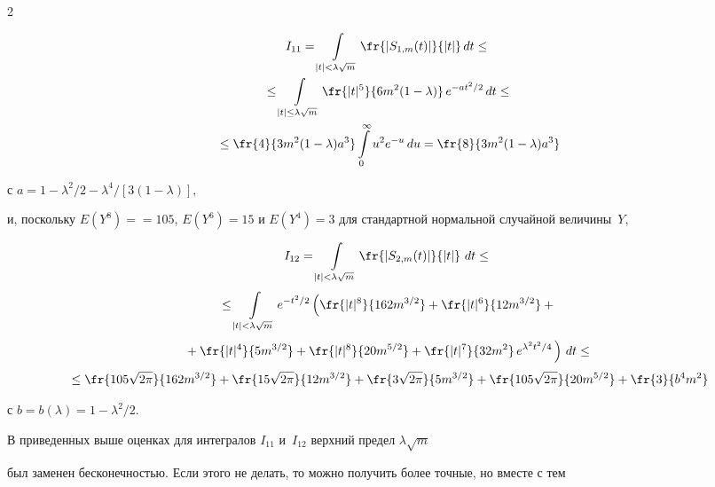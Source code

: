 \begin{multicols}{2}
\noindent


\begin{multline*}


I_{11}  =  \int\limits_{|t|<\lambda\sqrt{m}} \fr{|S_{1,m}(t)|}{|t|} \,dt \leq{}\\


{}\leq \int\limits_{|t| \leq \lambda\sqrt{m}} \fr{|t|^5}{6m^2(1-\lambda)} \,e^{-at^2/2}\,dt \leq{}\\


{}\leq  \fr{4}{3m^2(1-\lambda)a^3}\int\limits_0^\infty u^2e^{-u}\,du


= \fr{8}{3m^2(1-\lambda)a^3} 




\end{multline*}


с  $a=1 -  \lambda^2/2 -   \lambda^4/[3(1-\lambda)]$,


и, поскольку $E(Y^8)=$\linebreak $=105$, $E(Y^6)=15$ и $E(Y^4)=3$ для стандартной нормальной случайной величины~$Y$,


\begin{multline*} %


I_{12}  =  \int\limits_{|t|<\lambda\sqrt{m}} \fr{|S_{2,m}(t)|}{|t|} \,\,dt\leq{}\\[3pt]


{} \leq \int\limits_{|t| < \lambda\sqrt{m}} e^{-t^2/2}\left(


\fr{|t|^8}{162m^{3/2}}+\fr{|t|^6}{12m^{3/2}}+{}\right. \\[3pt]


\left.{}+\fr{ |t|^4}{5m^{3/2}}+\fr{ |t|^8}{20m^{5/2}}+\fr{|t|^7}{32m^2}\, e^{\lambda^2 t^2 /4}\,\right)\,dt \leq{}\\[3pt]


{}\leq \fr{105 \sqrt{2\pi}}{162m^{3/2}}+\fr{15\sqrt{2\pi}}{12m^{3/2}} +


\fr{3\sqrt{2\pi}}{5m^{3/2}} +\fr{105\sqrt{2\pi}}{20m^{5/2} }+


\fr{3}{b^4 m^2}


\end{multline*}


с $b=b(\lambda)=1- \lambda^2/2$.








В приведенных выше оценках для интегралов   $I_{11}$ и~$I_{12}$ верхний предел $\lambda\sqrt{m}$ 


был заменен бесконечностью. Если этого не делать, то можно получить более точные, но вместе с тем 



\end{multicols}
